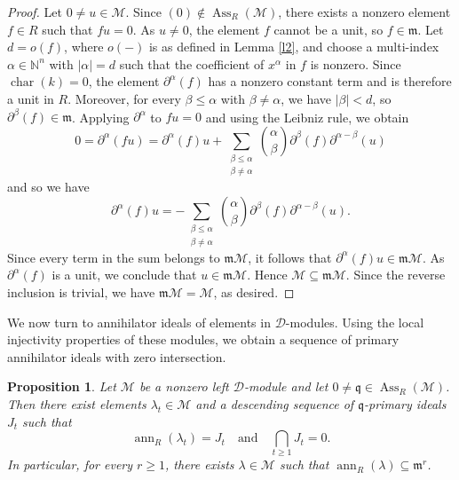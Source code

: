 \documentclass[11pt]{amsart}
\newtheorem{proposition}[theorem]{Proposition}
\theoremstyle{definition}
\newcommand{\m}{\mathfrak m}
\newcommand{\q}{\mathfrak q}
\newcommand{\D}{\mathcal D}
\newcommand{\M}{\mathcal M}
\DeclareMathOperator{\ann}{ann}
\DeclareMathOperator{\Ass}{Ass}
\begin{document}
\begin{proof}
Let $0\neq u\in \M$. Since $(0)\notin\Ass_R(\M)$, there exists a nonzero element $f\in R$ such that $fu=0$. As $u\neq0$, the element $f$ cannot be a unit, so $f\in\m$. Let $d=o(f)$, where $o(-)$ is as defined in Lemma \ref{l2}, and choose a multi-index $\alpha\in\mathbb N^n$ with $|\alpha|=d$ such that the coefficient of $x^\alpha$ in $f$ is nonzero. Since $\operatorname{char}(k)=0$, the element $\partial^\alpha(f)$ has a nonzero constant term and is therefore a unit in $R$. Moreover, for every $\beta\leq\alpha$ with $\beta\neq\alpha$, we have $|\beta|<d$, so $\partial^\beta(f)\in\mathfrak m$. Applying $\partial^\alpha$ to $fu=0$ and using the Leibniz rule, we obtain
\[
0=\partial^\alpha(fu)
=\partial^\alpha(f)u+
\sum_{\substack{\beta\leq\alpha\\\beta\neq\alpha}}
\binom{\alpha}{\beta}
\partial^\beta(f)\partial^{\alpha-\beta}(u)
\]
and so we have 
\[
\partial^\alpha(f)u=-
\sum_{\substack{\beta\leq\alpha\\\beta\neq\alpha}}
\binom{\alpha}{\beta}
\partial^\beta(f)\partial^{\alpha-\beta}(u).
\]
Since every term in the sum belongs to $\m\M$, it follows that $\partial^\alpha(f)u\in\m\M$. As $\partial^\alpha(f)$ is a unit, we conclude that $u\in\m \M$. Hence $\M\subseteq\m\M$. Since the reverse inclusion is trivial, we have $\m\M=\M$, as desired.
\end{proof}

We now turn to annihilator ideals of elements in $\D$-modules. Using the local injectivity
properties of these modules, we obtain a sequence of primary annihilator ideals with zero intersection.

\begin{proposition}\label{p1} Let $\M$ be a nonzero left $\D$-module and let $0\neq\q\in\Ass_R(\M)$. Then there exist elements $\lambda_t\in \M$ and
a descending sequence of $\q$-primary ideals $J_t$ such that
\[
\ann_R(\lambda_t)=J_t
\quad\text{and}\quad
\bigcap_{t\geq1}J_t=0.
\]
In particular, for every $r\geq1$, there exists $\lambda\in \M$ such that
$\ann_R(\lambda)\subseteq\m^r$.
\end{proposition}
\end{document}
